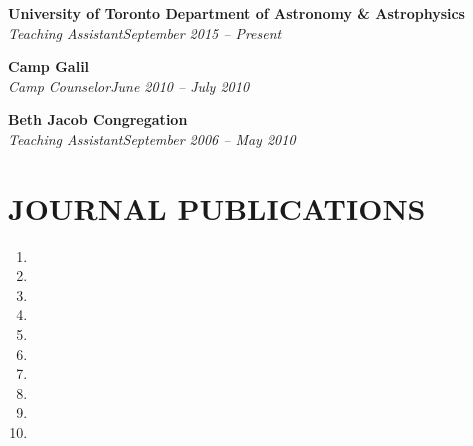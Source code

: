 \documentclass[10pt]{res} %
\begin{document}
\begin{resume}
\textbf{University of Toronto Department of Astronomy \& Astrophysics}\\
{\sl Teaching Assistant}\hfill{\sl September 2015 -- Present}%


\textbf{Camp Galil}\\
{\sl Camp Counselor}\hfill{\sl June 2010 -- July 2010}



\textbf{Beth Jacob Congregation}\\
{\sl Teaching Assistant}\hfill{\sl September 2006 -- May 2010}





 
\section{JOURNAL PUBLICATIONS}

\begin{enumerate}
\item {}
\item {}
\item {}
\item {}
\item {}
\item {}
\item {}
\item {}
\item {}
\item {}
\end{enumerate}
% 



\end{resume}
\end{document}
